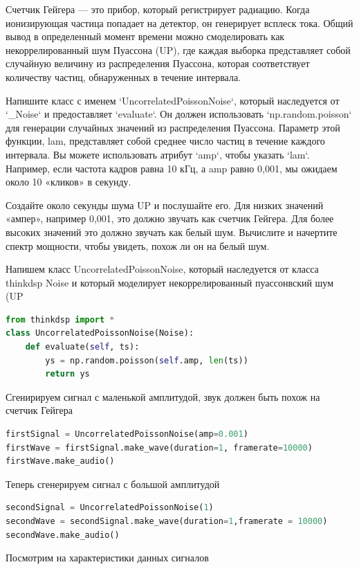 Счетчик Гейгера — это прибор, который регистрирует радиацию. Когда ионизирующая частица попадает на детектор, он генерирует всплеск тока. Общий вывод в определенный момент времени можно смоделировать как некоррелированный шум Пуассона (UP), где каждая выборка представляет собой случайную величину из распределения Пуассона, которая соответствует количеству частиц, обнаруженных в течение интервала.

Напишите класс с именем `UncorrelatedPoissonNoise`, который наследуется от `\_Noise` и предоставляет `evaluate`. Он должен использовать `np.random.poisson` для генерации случайных значений из распределения Пуассона. Параметр этой функции, lam, представляет собой среднее число частиц в течение каждого интервала. Вы можете использовать атрибут `amp`, чтобы указать `lam`. Например, если частота кадров равна 10 кГц, а amp равно 0,001, мы ожидаем около 10 «кликов» в секунду.

Создайте около секунды шума UP и послушайте его. Для низких значений «ампер», например 0,001, это должно звучать как счетчик Гейгера. Для более высоких значений это должно звучать как белый шум. Вычислите и начертите спектр мощности, чтобы увидеть, похож ли он на белый шум.

Напишем класс UncorrelatedPoissonNoise, который наследуется от класса thinkdsp Noise и который моделирует некоррелированный пуассонвский шум (UP

\begin{lstlisting}[language=Python]
from thinkdsp import *
class UncorrelatedPoissonNoise(Noise):
    def evaluate(self, ts):
        ys = np.random.poisson(self.amp, len(ts))
        return ys
\end{lstlisting}
Сгенирируем сигнал с маленькой амплитудой, звук должен быть похож на счетчик Гейгера
\begin{lstlisting}[language=Python]
firstSignal = UncorrelatedPoissonNoise(amp=0.001)
firstWave = firstSignal.make_wave(duration=1, framerate=10000)
firstWave.make_audio()
\end{lstlisting}

Теперь сгенерируем сигнал с большой амплитудой

\begin{lstlisting}[language=Python]
secondSignal = UncorrelatedPoissonNoise(1)
secondWave = secondSignal.make_wave(duration=1,framerate = 10000)
secondWave.make_audio()
\end{lstlisting}

Посмотрим на характеристики данных сигналов

